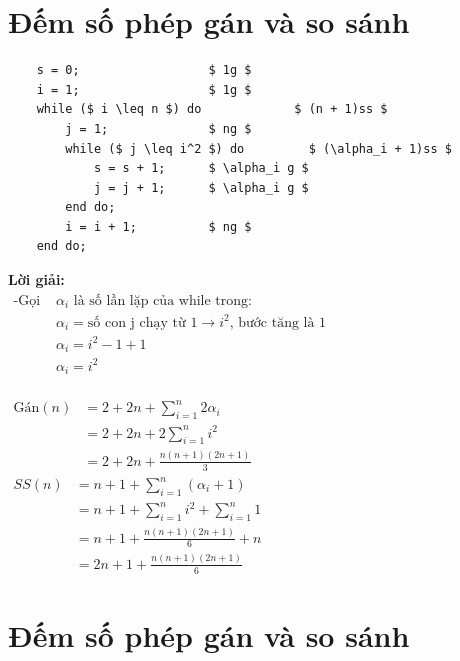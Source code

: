 \documentclass[12pt, letterpaper]{article}
\begin{document}
\section{Đếm số phép gán và so sánh}

\begin{lstlisting}
    s = 0;                  $ 1g $
    i = 1;                  $ 1g $
    while ($ i \leq n $) do             $ (n + 1)ss $
        j = 1;              $ ng $
        while ($ j \leq i^2 $) do         $ (\alpha_i + 1)ss $
            s = s + 1;      $ \alpha_i g $
            j = j + 1;      $ \alpha_i g $
        end do;
        i = i + 1;          $ ng $
    end do;
  \end{lstlisting}
\textbf{Lời giải:} \\
$ \begin{aligned}
	\text{-Gọi } & \alpha_i \text{ là số lần lặp của while trong:}                              \\
				& \alpha_i = \text{số con j chạy từ 1} \rightarrow i^2 \text{, bước tăng là 1} \\
				& \alpha_i = i^2 - 1 + 1                                                       \\
				& \alpha_i = i^2
	\end{aligned} $ \\
 \\
$ \begin{aligned}
	\text{Gán}(n) & = 2 + 2n + \sum^{n}_{i = 1} 2 \alpha_i \\
	              & = 2 + 2n + 2 \sum^{n}_{i = 1} i^2      \\
	              & = 2 + 2n + \frac{n(n + 1)(2n + 1)}{3}
\end{aligned} $ \\

$ \begin{aligned}
	SS(n) & = n + 1 + \sum^{n}_{i = 1} (\alpha_i + 1)           \\
	      & = n + 1 + \sum^{n}_{i = 1} i^2 + \sum^{n}_{i = 1} 1 \\
	      & = n + 1 + \frac{n(n + 1)(2n + 1)}{6} + n            \\
	      & = 2n + 1 + \frac{n(n + 1)(2n + 1)}{6}
\end{aligned} $ \\

\section{Đếm số phép gán và so sánh}
\end{document}
